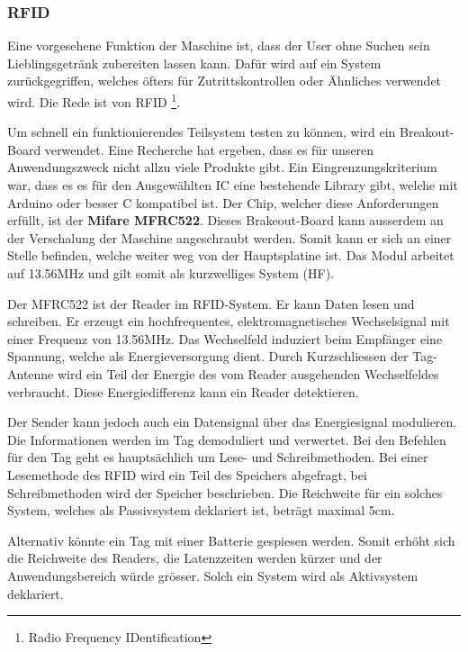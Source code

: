 \subsubsection{RFID}
\label{subsubsec:RFID}

Eine vorgesehene Funktion der Maschine ist, dass der User ohne Suchen sein Lieblingsgetränk zubereiten lassen kann. Dafür wird auf ein System zurückgegriffen, welches öfters für Zutrittskontrollen oder Ähnliches verwendet wird. Die Rede ist von RFID \footnote{Radio Frequency IDentification}.

Um schnell ein funktionierendes Teilsystem testen zu können, wird ein Breakout-Board verwendet. Eine Recherche hat ergeben, dass es für unseren Anwendungszweck nicht allzu viele Produkte gibt. Ein Eingrenzungskriterium war, dass es es für den Ausgewählten IC eine bestehende Library gibt, welche mit Arduino oder besser C kompatibel ist. Der Chip, welcher diese Anforderungen erfüllt, ist der \textbf{Mifare MFRC522}. Dieses Brakeout-Board kann ausserdem an der Verschalung der Maschine angeschraubt werden. Somit kann er sich an einer Stelle befinden, welche weiter weg von der Hauptsplatine ist.
Das Modul arbeitet auf 13.56MHz und gilt somit als kurzwelliges System (HF). \cite{nxp_semiconductors_nv_mfrc522_2017}

Der MFRC522 ist der Reader im RFID-System. Er kann Daten lesen und schreiben. Er erzeugt ein hochfrequentes, elektromagnetisches Wechselsignal mit einer Frequenz von 13.56MHz. Das Wechselfeld induziert beim Empfänger eine Spannung, welche als Energieversorgung dient. Durch Kurzschliessen der Tag-Antenne wird ein Teil der Energie des vom Reader ausgehenden Wechselfeldes verbraucht. Diese Energiedifferenz kann ein Reader detektieren.

Der Sender kann jedoch auch ein Datensignal über das Energiesignal modulieren. Die Informationen werden im Tag demoduliert und verwertet. Bei den Befehlen für den Tag geht es hauptsächlich um Lese- und Schreibmethoden. Bei einer Lesemethode des RFID wird ein Teil des Speichers abgefragt, bei Schreibmethoden wird der Speicher beschrieben. Die Reichweite für ein solches System, welches als Passivsystem deklariert ist, beträgt maximal 5cm.

Alternativ könnte ein Tag mit einer Batterie gespiesen werden. Somit erhöht sich die Reichweite des Readers, die Latenzzeiten werden kürzer und der Anwendungsbereich würde grösser. Solch ein System wird als Aktivsystem deklariert. \cite{rfid-basisde_aufbau_2018}

